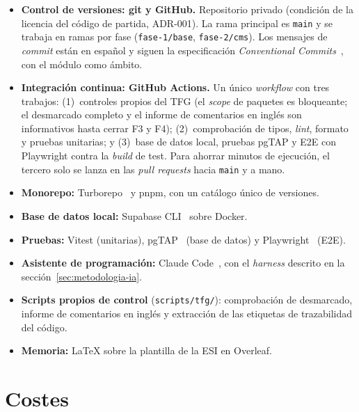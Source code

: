 \begin{itemize}
  \item \textbf{Control de versiones: git y GitHub.} Repositorio privado
        (condición de la licencia del código de partida, ADR-001). La rama
        principal es \texttt{main} y se trabaja en ramas por fase
        (\texttt{fase-1/base}, \texttt{fase-2/cms}). Los mensajes de
        \textit{commit} están en español y siguen la especificación
        \textit{Conventional Commits}~\cite{conventionalcommits}, con el
        módulo como ámbito.
  \item \textbf{Integración continua: GitHub Actions.} Un único
        \textit{workflow} con tres trabajos: (1)~controles propios del TFG
        (el \textit{scope} de paquetes es bloqueante; el desmarcado completo
        y el informe de comentarios en inglés son informativos hasta cerrar
        F3 y F4); (2)~comprobación de tipos, \textit{lint}, formato y pruebas
        unitarias; y (3)~base de datos local, pruebas pgTAP y E2E con
        Playwright contra la \textit{build} de test. Para ahorrar minutos de
        ejecución, el tercero solo se lanza en las \textit{pull requests}
        hacia \texttt{main} y a mano.
  \item \textbf{Monorepo:} Turborepo~\cite{turborepo} y pnpm, con un catálogo
        único de versiones.
  \item \textbf{Base de datos local:} Supabase CLI~\cite{supabase-docs} sobre
        Docker.
  \item \textbf{Pruebas:} Vitest (unitarias), pgTAP~\cite{pgtap} (base de
        datos) y Playwright~\cite{playwright} (E2E).
  \item \textbf{Asistente de programación:} Claude Code~\cite{claudecode},
        con el \textit{harness} descrito en la
        sección~\ref{sec:metodologia-ia}.
  \item \textbf{Scripts propios de control} (\texttt{scripts/tfg/}):
        comprobación de desmarcado, informe de comentarios en inglés y
        extracción de las etiquetas de trazabilidad del código.
  \item \textbf{Memoria:} \LaTeX{} sobre la plantilla de la ESI en Overleaf.
\end{itemize}

\section{Costes}
\label{sec:costes}


